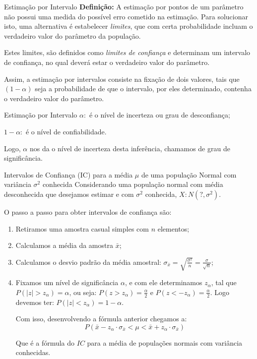 \documentclass[hyperref={pdfpagelabels=false}]{beamer}
\begin{document}
\begin{frame}{Estimação por Intervalo}
{\bf Definição:} A estimação por pontos de um parâmetro não possui uma medida do possível erro cometido na estimação. Para solucionar isto, uma alternativa é estabelecer \emph{limites}, que com certa probabilidade incluam  o verdadeiro valor do parâmetro da população.

\pause
Estes limites, são definidos como \emph{limites de confiança} e determinam um intervalo de confiança, no qual deverá estar o verdadeiro valor do parâmetro.

\pause
Assim, a estimação por intervalos consiste na fixação de dois valores, tais que $(1 - \alpha)$ seja a probabilidade de que o intervalo, por eles determinado, contenha o verdadeiro valor do parâmetro.
\end{frame}

\begin{frame}{Estimação por Intervalo}
	$\alpha:$ é o nível de incerteza ou grau de desconfiança;
	
	\pause
	$1 - \alpha:$ é o nível de confiabilidade.
	
	\pause
	Logo, $\alpha$ nos da o nível de incerteza desta inferência, chamamos de grau de significância.
\end{frame}

\begin{frame}{Intervalos de Confiança (IC) para a média $\mu$ de uma população Normal com variância $\sigma^2$ conhecida}
	Considerando uma população normal com média desconhecida que desejamos estimar e com $\sigma^2$ conhecida, $X:N(?,\sigma^2)$.
	\pause
	
	O passo a passo para obter intervalos de confiança são:
	\pause
	\begin{enumerate}
		\item Retiramos uma amostra casual simples com $n$ elementos;
		\item Calculamos a média da amostra $\bar{x}$;
		\item Calculamos o desvio padrão da média amostral: $\sigma_{\bar{x}} = \displaystyle \sqrt{\frac{\sigma^2}{n}} = \frac{\sigma}{\sqrt{n}}$;
		\item Fixamos um nível de significância $\alpha$, e com ele determinamos $z_\alpha$, tal que $P(|z|>z_\alpha) = \alpha$, ou seja: $P(z>z_\alpha) = \displaystyle \frac{\alpha}{2}$ e $P(z<-z_\alpha) = \displaystyle \frac{\alpha}{2}$. Logo devemos ter: $P(|z| < z_\alpha) = 1-\alpha$. 
		
		Com isso, desenvolvendo a fórmula anterior chegamos a:
		$$P(\bar{x}-z_\alpha\cdot \sigma_{\bar{x}} < \mu < \bar{x}+z_\alpha\cdot \sigma_{\bar{x}})$$
		
		Que é a fórmula do $IC$ para a média de populações normais com variância conhecidas.
	\end{enumerate}
\end{frame}
\end{document}
